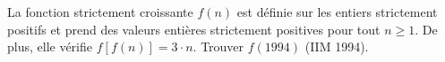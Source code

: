 La fonction strictement croissante $f(n)$ est définie sur les entiers strictement positifs et prend des valeurs entières strictement positives pour tout $n \geq 1$. De plus, elle vérifie $f[f(n)] = 3 \cdot n$. Trouver $f(1994)$ (IIM 1994).
